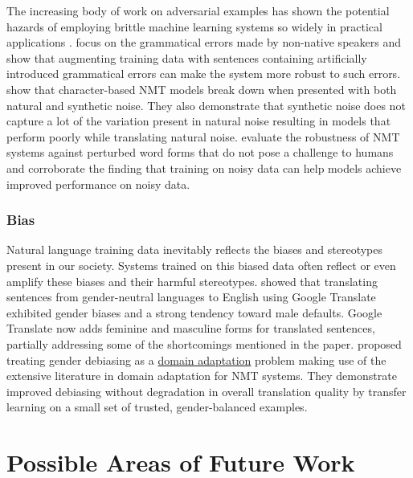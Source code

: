 \documentclass[11pt]{article}
\begin{document}
The increasing body of work on adversarial examples has shown the potential hazards of employing brittle machine learning systems so widely in practical applications \citep{DBLP:journals/corr/GoodfellowSS14, narodytska2017simple, sakaguchi2017robsut}.
\cite{anastasopoulos-etal-2019-neural} focus on the grammatical errors made by non-native speakers and show that augmenting training data with sentences containing artificially introduced grammatical errors can make the system more robust to such errors.
\cite{DBLP:conf/iclr/BelinkovB18} show that character-based NMT models break down when presented with both natural and synthetic noise. They also demonstrate that synthetic noise does not capture a lot of the variation present in natural noise resulting in models that perform poorly while translating natural noise.
\cite{heigold-etal-2018-robust} evaluate the robustness of NMT systems against perturbed word forms that do not pose a challenge to humans and corroborate the finding that training on noisy data can help models achieve improved performance on noisy data.

\subsubsection*{Bias} \vspace{-2mm}
Natural language training data inevitably reflects the biases and stereotypes present in our society. Systems trained on this biased data often reflect or even amplify these biases and their harmful stereotypes.
\cite{prates2020assessing} showed that translating sentences from gender-neutral languages to English using Google Translate exhibited gender biases and a strong tendency toward male defaults.
Google Translate now adds feminine and masculine forms for translated sentences, partially addressing some of the shortcomings mentioned in the paper. 
\cite{saunders-byrne-2020-reducing} proposed treating gender debiasing as a \hyperref[heading:domadapt]{domain adaptation} problem making use of the extensive literature in domain adaptation for NMT systems. They demonstrate improved debiasing without degradation in overall translation quality by transfer learning on a small set of trusted, gender-balanced examples.

\section{Possible Areas of Future Work} \vspace{-0.8em}
\end{document}
